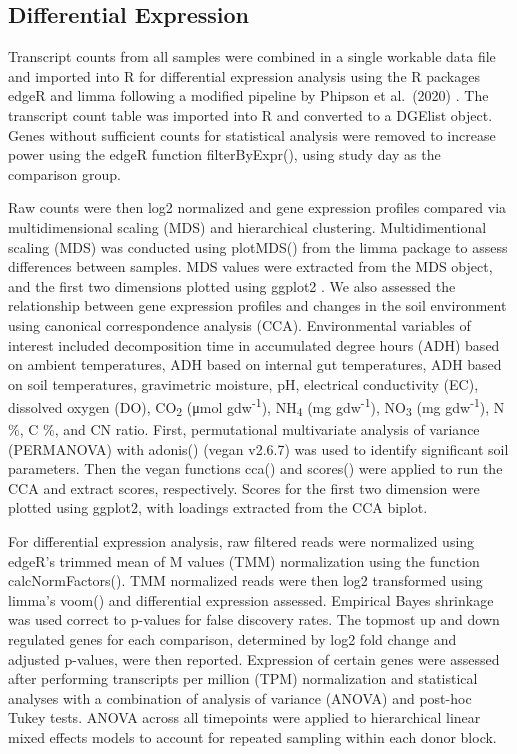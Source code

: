 \documentclass[
  sn-nature,
  lineno, referee]{sn-jnl}
\begin{document}
\subsection{Differential Expression}\label{differential-expression}

Transcript counts from all samples were combined in a single workable
data file and imported into R for differential expression analysis using
the R packages edgeR \citep{robinson_edger_2010} and limma
\citep{smyth_limma_2005} following a modified pipeline by Phipson et
al.~(2020) \citep{phipson_differential_2020}. The transcript count table
was imported into R and converted to a DGElist object. Genes without
sufficient counts for statistical analysis were removed to increase
power using the edgeR function filterByExpr(), using study day as the
comparison group.

Raw counts were then log2 normalized and gene expression profiles
compared via multidimensional scaling (MDS) and hierarchical clustering.
Multidimentional scaling (MDS) was conducted using plotMDS() from the
limma package to assess differences between samples. MDS values were
extracted from the MDS object, and the first two dimensions plotted
using ggplot2 \citep{wickham_ggplot2_2016}. We also assessed the
relationship between gene expression profiles and changes in the soil
environment using canonical correspondence analysis (CCA). Environmental
variables of interest included decomposition time in accumulated degree
hours (ADH) based on ambient temperatures, ADH based on internal gut
temperatures, ADH based on soil temperatures, gravimetric moisture, pH,
electrical conductivity (EC), dissolved oxygen (DO), CO\textsubscript{2}
(μmol gdw\textsuperscript{-1}), NH\textsubscript{4} (mg
gdw\textsuperscript{-1}), NO\textsubscript{3} (mg
gdw\textsuperscript{-1}), N \%, C \%, and CN ratio. First, permutational
multivariate analysis of variance (PERMANOVA) with adonis() (vegan
v2.6.7) \citep{oksanen_vegan_2024} was used to identify significant soil
parameters. Then the vegan functions cca() and scores() were applied to
run the CCA and extract scores, respectively. Scores for the first two
dimension were plotted using ggplot2, with loadings extracted from the
CCA biplot.

For differential expression analysis, raw filtered reads were normalized
using edgeR's trimmed mean of M values (TMM) normalization using the
function calcNormFactors(). TMM normalized reads were then log2
transformed using limma's voom() and differential expression assessed.
Empirical Bayes shrinkage was used correct to p-values for false
discovery rates. The topmost up and down regulated genes for each
comparison, determined by log2 fold change and adjusted p-values, were
then reported. Expression of certain genes were assessed after
performing transcripts per million (TPM) normalization and statistical
analyses with a combination of analysis of variance (ANOVA) and post-hoc
Tukey tests. ANOVA across all timepoints were applied to hierarchical
linear mixed effects models to account for repeated sampling within each
donor block.
\end{document}
